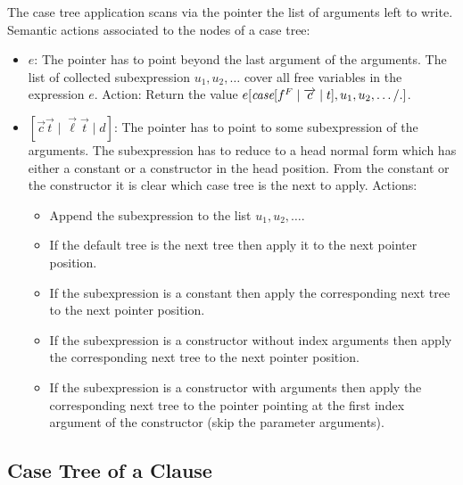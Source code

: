 The case tree application scans via the pointer the list of arguments left to
write. Semantic actions associated to the nodes of a case tree:
\begin{itemize}
    \item $e$: The pointer has to point beyond the last argument of the
        arguments. The list of collected subexpression $u_1, u_2, \ldots$ cover
        all free variables in the expression $e$. Action: Return the value
        $e[{\text{\it case}}[f^F \mid {\overrightarrow {c}} \mid t], u_1,u_2,\ldots / .]$.

    \item $[\vec c \vec t \mid \vec \ell \vec t \mid d]$:
        The pointer has to point to some subexpression of the arguments. The
        subexpression has to reduce to a head normal form which has either a
        constant or a constructor in the head position. From the constant or the
        constructor it is clear which case tree is the next to apply.
        Actions:
        \begin{itemize}
            \item Append the subexpression to the list $u_1,u_2,\ldots$.

            \item If the default tree is the next tree then apply it to the next
                pointer position.

            \item If the subexpression is a constant then apply the
                corresponding next tree to the next pointer position.

            \item If the subexpression is a constructor without index
                arguments then apply the corresponding next tree to the next
                pointer position.

            \item If the subexpression is a constructor with arguments then
                apply the corresponding next tree to the pointer pointing at the
                first index argument of the constructor (skip the parameter
                arguments).
        \end{itemize}
\end{itemize}




\subsection{Case Tree of a Clause}

